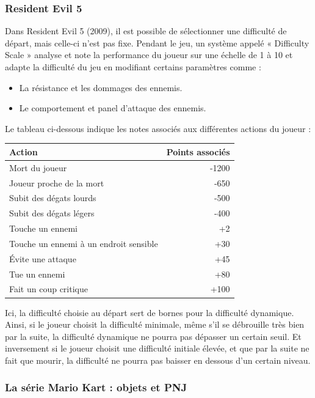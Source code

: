 \documentclass[a4paper, 12pt]{article} %
\begin{document}
\newpage
\subsubsection{Resident Evil 5}

Dans Resident Evil 5 (2009), il est possible de sélectionner une difficulté de départ, mais celle-ci n’est pas fixe. Pendant le jeu, un système appelé « Difficulty Scale » analyse et note la performance du joueur sur une échelle de 1 à 10 et adapte la difficulté du jeu en modifiant certains paramètres comme :

\begin{itemize}
	\item La résistance et les dommages des ennemis.
	\item Le comportement et panel d'attaque des ennemis.
\end{itemize}

Le tableau ci-dessous indique les notes associés aux différentes actions du joueur :

\begin{center} 
	\begin{tabular}{|l|r|}
		\hline
		Action 									&Points associés\\
		\hline
		Mort du joueur							&-1200\\
		Joueur proche de la mort				&-650\\
		Subit des dégats lourds					&-500\\
		Subit des dégats légers					&-400\\
		\hline
		Touche un ennemi						&+2\\
		Touche un ennemi à un endroit sensible	&+30\\
		Évite une attaque						&+45\\
		Tue un ennemi							&+80\\
		Fait un coup critique					&+100\\
		\hline
	\end{tabular}
\end{center}

Ici, la difficulté choisie au départ sert de bornes pour la difficulté dynamique. Ainsi, si le joueur choisit la difficulté minimale, même s’il se débrouille très bien par la suite, la difficulté dynamique ne pourra pas dépasser un certain seuil. Et inversement si le joueur choisit une difficulté initiale élevée, et que par la suite ne fait que mourir, la difficulté ne pourra pas baisser en dessous d’un certain niveau.

\newpage
\subsubsection{La série Mario Kart : objets et PNJ}
\end{document}
